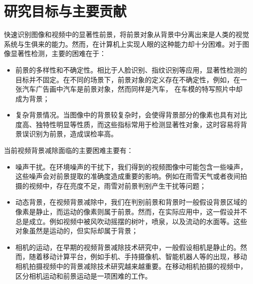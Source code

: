 \section{研究目标与主要贡献}
\label{sec:contents}
快速识别图像和视频中的显著性前景，将前景对象从背景中分离出来是人类的视觉系统与生俱来的能力。然而，在计算机上实现人眼的这种能力却十分困难。对于图像显著性检测，主要的困难在于：
 \begin{itemize}
     \item 前景的多样性和不确定性。相比于人脸识别、指纹识别等应用，显著性检测的目标并不固定。在不同的场景下，前景对象的定义存在不确定性，例如，在一张汽车广告画中汽车是前景对象，然而同样是汽车， 在车模的特写照片中却成为背景；
	\item 复杂背景情况。当图像中的背景较复杂时，会使得背景部分的像素也具有对比度高、独特性明显等性质，而这些指标常用于检测显著性对象，这时容易将背景误识别为前景，造成误检率高。
\end{itemize}
当前视频背景减除面临的主要困难主要有：
\begin{itemize}
	\item 噪声干扰。在环境噪声的干扰下，我们得到的视频图像中可能包含一些噪声，这些噪声会对前景提取的准确度造成重要的影响。例如在雨雪天气或者夜间拍摄的视频中，存在亮度不足，雨雪对前景判别产生干扰等问题；
    \item 动态背景，在视频背景减除中，我们在判别前景和背景时一般假设背景区域的像素是静止，而运动的像素则属于前景。然而，在实际应用中，这一假设并不总是成立。例如视频中被风吹动摇摆的树叶，喷泉，以及流动的水面等。这些对象虽然是运动的，但实际却属于背景；
    \item 相机的运动，在早期的视频背景减除技术研究中，一般假设相机是静止的。然而，随着移动计算平台，例如手机、手持摄像机、智能机器人等的出现，移动相机拍摄视频中的背景减除技术研究越来越重要。在移动相机拍摄的视频中，区分相机运动和前景运动是一项困难的工作。
  \end{itemize}

